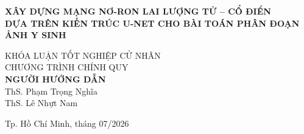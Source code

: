 \begin{titlepage}
\begin{center}

{ \Large \bfseries XÂY DỰNG MẠNG NƠ-RON LAI LƯỢNG TỬ -- CỔ ĐIỂN \\ DỰA TRÊN KIẾN TRÚC U-NET CHO BÀI TOÁN PHÂN ĐOẠN ẢNH Y SINH \\[2cm]}


\large KHÓA LUẬN TỐT NGHIỆP CỬ NHÂN\\
\large CHƯƠNG TRÌNH CHÍNH QUY\\[2cm]

\textbf{NGƯỜI HƯỚNG DẪN}\\
ThS. Phạm Trọng Nghĩa\\
ThS. Lê Nhựt Nam\\



\vfill
Tp. Hồ Chí Minh, tháng 07/2026

\end{center}

\end{titlepage}